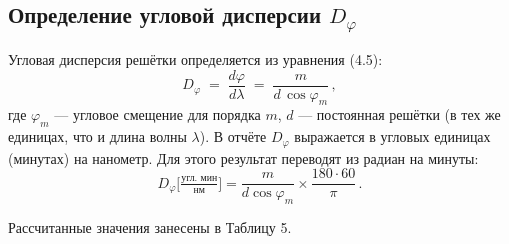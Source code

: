 \subsection{Определение угловой дисперсии \(D_{\varphi}\)}

Угловая дисперсия решётки определяется из уравнения (4.5):
\[
	D_{\varphi} \;=\;\frac{d\varphi}{d\lambda}
	\;=\;\frac{m}{d\,\cos\varphi_m}\,,
\]
где \(\varphi_m\) — угловое смещение для порядка \(m\), \(d\) — постоянная решётки (в тех же единицах, что и длина волны \(\lambda\)).
В отчёте \(D_{\varphi}\) выражается в угловых единицах (минутах) на нанометр. Для этого результат переводят из радиан на минуты:
\[
	D_{\varphi}\bigl[\tfrac{\text{угл. мин}}{\text{нм}}\bigr]
	= \frac{m}{d\cos\varphi_m}\times\frac{180\cdot60}{\pi}\,.
\]

Рассчитанные значения занесены в Таблицу 5.
